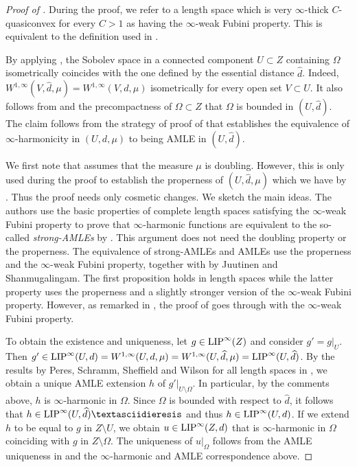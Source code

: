 \documentclass[reqno]{amsart}
\newcommand{\LIP}{{\rm LIP}}
\numberwithin{equation}{section}
\theoremstyle{remark}
\begin{document}
\begin{proof}[Proof of ]
During the proof, we refer to a length space which is very $\infty$-thick $C$-quasiconvex for every $C>1$ as having the $\infty$-weak Fubini property. This is equivalent to the definition used in \cite[Definition 4.1 and Proposition 4.2]{Dur:Jar:Sha:19}.

By applying , the Sobolev space in a connected component $U \subset Z$ containing $\Omega$ isometrically coincides with the one defined by the essential distance $\widehat{d}$. Indeed, $W^{1,\infty}( V, \widehat{d}, \mu )=W^{1,\infty}(V,d,\mu) $ isometrically for every open set $V \subset U$. It also follows from  and the precompactness of $\Omega \subset Z$ that $\Omega$ is bounded in $( U, \widehat{d} )$. The claim follows from the strategy of proof of \cite[Theorem 1.2]{Dur:Jar:Sha:19} that establishes the equivalence of $\infty$-harmonicity in $( U, d, \mu )$ to being AMLE in $(U, \widehat{d} )$.

We first note that \cite[Theorem 1.2]{Dur:Jar:Sha:19} assumes that the measure $\mu$ is doubling. However, this is only used during the proof to establish the properness of $( U, \widehat{d}, \mu )$ which we have by . Thus the proof needs only cosmetic changes. We sketch the main ideas. The authors use the basic properties of complete length spaces satisfying the $\infty$-weak Fubini property to prove that $\infty$-harmonic functions are equivalent to the so-called \emph{strong-AMLEs} by \cite[Lemma 4.6 and Remark 4.7]{Dur:Jar:Sha:19}. This argument does not need the doubling property or the properness. The equivalence of strong-AMLEs and AMLEs use the properness and the $\infty$-weak Fubini property, together with \cite[Propositions 4.1 and 5.8]{Juut:Shan:06} by Juutinen and Shanmugalingam. The first proposition holds in length spaces while the latter property uses the properness and a slightly stronger version of the $\infty$-weak Fubini property. However, as remarked in \cite[Proof of Theorem 4.10]{Dur:Jar:Sha:19}, the proof of \cite[Proposition 5.8]{Juut:Shan:06} goes through with the $\infty$-weak Fubini property. 

To obtain the existence and uniqueness, let $g \in \LIP^{\infty}(Z)$ and consider $g' = g|_{U}$. Then $g' \in \LIP^{\infty}(U,d) = W^{1,\infty}(U,d,\mu) = W^{1,\infty}( U, \widehat{d}, \mu ) = \LIP^{\infty}( U, \widehat{d} )$. By the results by Peres, Schramm, Sheffield and Wilson for all length spaces in \cite[Theorem 1.4]{Per:Schr:Sheff:Wil:09}, we obtain a unique AMLE extension $h$ of $g'|_{ U \setminus \Omega }$. In particular, by the comments above, $h$ is $\infty$-harmonic in $\Omega$. Since $\Omega$ is bounded with respect to $\widehat{d}$, it follows that $h \in \LIP^{\infty}(U, \widehat{d})¨$ and thus $h \in \LIP^{\infty}(U,d)$. If we extend $h$ to be equal to $g$ in $Z \setminus U$, we obtain $u \in \LIP^{\infty}(Z,d)$ that is $\infty$-harmonic in $\Omega$ coinciding with $g$ in $Z \setminus \Omega$. The uniqueness of $u|_{\Omega}$ follows from the AMLE uniqueness in \cite{Per:Schr:Sheff:Wil:09} and the $\infty$-harmonic and AMLE correspondence above.
\end{proof}
\end{document}
